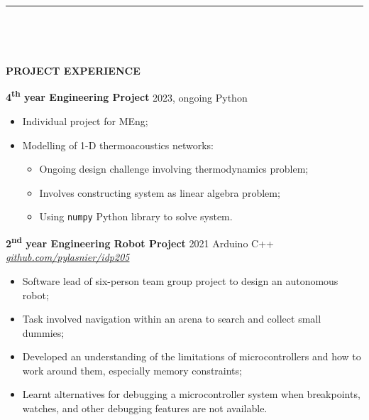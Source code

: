 \documentclass[
  11pt,
  a4paper,
]{article}
\providecommand{\tightlist}{%
  \setlength{\itemsep}{0pt}\setlength{\parskip}{0pt}}
\newcommand{\itemspace}{0.8ex}
\newcommand{\ruledheader}[2]{%
\begingroup
\setlength{\fboxsep}{0pt}%
\colorbox{#1}{%
\parbox[b][1.2ex][t]{35mm}{\begin{tiny}\ \end{tiny}}}%
\parbox[b][1.2ex][t]{5mm}{\begin{tiny}\ \end{tiny}}%
\uppercase{\textbf{#2}}
\endgroup}
\begin{document}
\begin{Large}

\vspace{-1.5ex}\rule{\textwidth}{0.8pt}\vspace{2ex}

\ruledheader{cyan!50!teal}{Project experience}\end{Large}

\vspace{\itemspace}

\textbf{4\textsuperscript{th} year Engineering Project} \textbar{} 2023,
ongoing \textbar{} Python

\begin{itemize}
\tightlist
\item
  Individual project for MEng;
\item
  Modelling of 1-D thermoacoustics networks:

  \begin{itemize}
  \tightlist
  \item
    Ongoing design challenge involving thermodynamics problem;
  \item
    Involves constructing system as linear algebra problem;
  \item
    Using \texttt{numpy} Python library to solve system.
  \end{itemize}
\end{itemize}

\vspace{\itemspace}

\textbf{2\textsuperscript{nd} year Engineering Robot Project} \textbar{}
2021 \textbar{} Arduino C++ \textbar{}
\href{https://github.com/pylasnier/idp205}{\emph{github.com/pylasnier/idp205}}

\begin{itemize}
\tightlist
\item
  Software lead of six-person team group project to design an autonomous
  robot;
\item
  Task involved navigation within an arena to search and collect small
  dummies;
\item
  Developed an understanding of the limitations of microcontrollers and
  how to work around them, especially memory constraints;
\item
  Learnt alternatives for debugging a microcontroller system when
  breakpoints, watches, and other debugging features are not available.
\end{itemize}

\pagebreak
\end{document}
